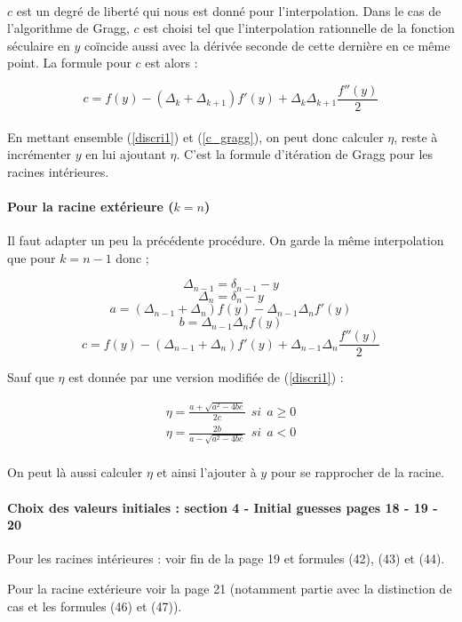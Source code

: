 \documentclass[10pt,a4paper]{article}
\begin{document}
\paragraph{}
$c$ est un degré de liberté qui nous est donné pour l'interpolation. Dans le cas de l'algorithme de Gragg, $c$ est choisi tel que l'interpolation rationnelle de la fonction séculaire en $y$ coïncide aussi avec la dérivée seconde de cette dernière en ce même point. La formule pour $c$ est alors : 

\begin{equation}\label{c_gragg}
c = f(y) - (\Delta_k + \Delta_{k+1}) f'(y) + \Delta_k \Delta_{k+1} \frac{f''(y)}{2}
\end{equation}

\paragraph{}
En mettant ensemble (\ref{discri1}) et (\ref{c_gragg}), on peut donc calculer $\eta$, reste à incrémenter $y$ en lui ajoutant $\eta$. C'est la formule d'itération de Gragg pour les racines intérieures.


\paragraph{Pour la racine extérieure ($k=n$)}

Il faut adapter un peu la précédente procédure. On garde la même interpolation que pour $k=n-1$ donc ;

$$ \Delta_{n-1} = \delta_{n-1} - y$$ 
$$ \Delta_n = \delta_n - y$$ 
$$ a = (\Delta_{n-1} + \Delta_n) f(y) - \Delta_{n-1} \Delta_nf'(y)$$
$$ b = \Delta_{n-1} \Delta_n f(y)$$
$$c = f(y) - (\Delta_{n-1} + \Delta_n) f'(y) + \Delta_{n-1} \Delta_n \frac{f''(y)}{2}$$

Sauf que $\eta$ est donnée par une version modifiée de (\ref{discri1}) : 

\begin{eqnarray}\label{discri2}
\eta = \frac{a + \sqrt{a^2 - 4bc}}{2c}~~ si~~ a \geq 0 \\
\eta = \frac{2b}{a - \sqrt{a^2 - 4bc}}~~ si~~ a < 0
\end{eqnarray}

\paragraph{}
On peut là aussi calculer $\eta$ et ainsi l'ajouter à $y$ pour se rapprocher de la racine.


\paragraph{Choix des valeurs initiales : section 4 - Initial guesses pages 18 - 19 - 20}

Pour les racines intérieures : voir fin de la page 19 et formules (42), (43) et (44).

Pour la racine extérieure voir la page 21 (notamment partie avec la distinction de cas et les formules (46) et (47)).




\printbibliography
\end{document}
